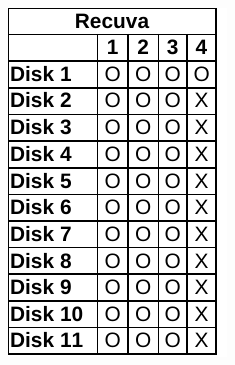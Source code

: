 \begin{paraphrase}
\begin{figure}
\begin{subfigure}[t]{0.17\linewidth}
        \includegraphics[width=\linewidth]{fig/recuva_results_fat.pdf}
    \end{subfigure}~~
    \begin{subfigure}[t]{0.17\linewidth}

\end{subfigure}
\end{figure}
\end{paraphrase}
